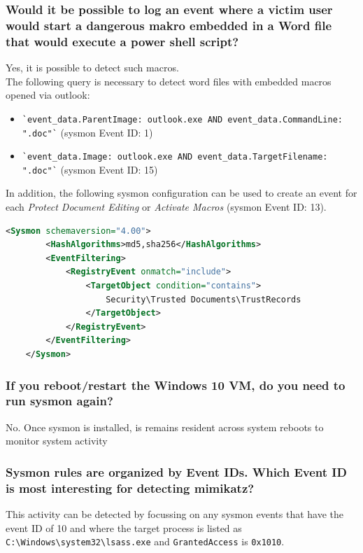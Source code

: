 \subsubsection{Would it be possible to log an event where a victim user would start a dangerous makro embedded in a Word file that would execute a power shell script?}
Yes, it is possible to detect such macros.\\
The following query is necessary to detect word files with embedded macros opened via outlook:\\
\begin{itemize}
    \item \lstinline|`event_data.ParentImage: outlook.exe AND event_data.CommandLine: ".doc"`| (sysmon Event ID: 1)
    \item \lstinline|`event_data.Image: outlook.exe AND event_data.TargetFilename: ".doc"`| (sysmon Event ID: 15)\\
\end{itemize}

In addition, the following sysmon configuration can be used to create an event for each \textit{Protect Document Editing} or \textit{Activate Macros} (sysmon Event ID: 13).

\begin{lstlisting}[language=XML]
    <Sysmon schemaversion="4.00">
        <HashAlgorithms>md5,sha256</HashAlgorithms>
        <EventFiltering>
            <RegistryEvent onmatch="include">
                <TargetObject condition="contains">
                    Security\Trusted Documents\TrustRecords
                </TargetObject>
            </RegistryEvent>
        </EventFiltering>
    </Sysmon>
\end{lstlisting}

\subsubsection{If you reboot/restart the Windows 10 VM, do you need to run sysmon again?}
No. Once sysmon is installed, is remains resident across system reboots to monitor system activity

\subsubsection{Sysmon rules are organized by Event IDs. Which Event ID is most interesting for detecting mimikatz?}
This activity can be detected by focussing on any sysmon events that have the event ID of 10 and where the target process is listed as \lstinline|C:\Windows\system32\lsass.exe| and \lstinline|GrantedAccess| is \lstinline|0x1010|.

